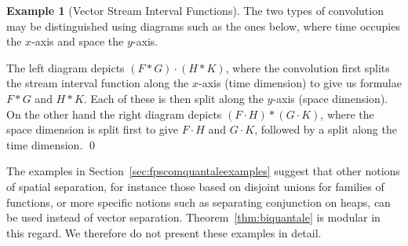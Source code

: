 \documentclass[12pt]{article}
\theoremstyle{definition}
\newtheorem{example}{Example}
\begin{document}
\begin{example}[Vector Stream Interval Functions]
  The two types of convolution may be distinguished using diagrams
  such as the ones below, where time occupies the $x$-axis and space
  the $y$-axis. 
  \begin{center}
  \end{center}
  The left diagram depicts $(F \ast G) \cdot (H \ast K)$, where the
  convolution first splits the stream interval function along the
  $x$-axis (time dimension) to give us formulae $F \ast G$ and $H \ast
  K$. Each of these is then split along the $y$-axis (space
  dimension). On the other hand the right diagram depicts $(F \cdot H)
  \ast (G \cdot K)$, where the space dimension is split first to give
  $F \cdot H$ and $G \cdot K$, followed by a split along the time
  dimension.  \qed
\end{example}
The examples in Section~\ref{sec:fpscomquantaleexamples} suggest that
other notions of spatial separation, for instance those based on
disjoint unions for families of functions, or more specific notions
such as separating conjunction on heaps, can be used instead of vector
separation.  Theorem~\ref{thm:biquantale} is modular in this
regard. We therefore do not present these examples in detail.
\end{document}
